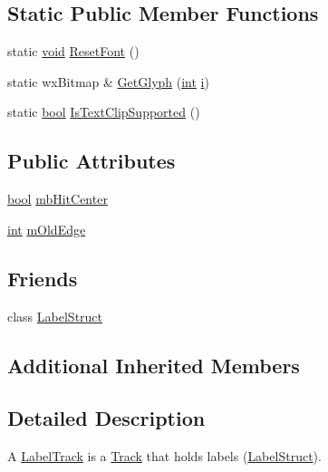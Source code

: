 \subsection*{Static Public Member Functions}
\begin{DoxyCompactItemize}
\item 
static \hyperlink{sound_8c_ae35f5844602719cf66324f4de2a658b3}{void} \hyperlink{class_label_track_a59ec120849f853dce17587dff2f71b84}{Reset\+Font} ()
\item 
static wx\+Bitmap \& \hyperlink{class_label_track_a693026a7f48f1fbb8fb6e98db6afee24}{Get\+Glyph} (\hyperlink{xmltok_8h_a5a0d4a5641ce434f1d23533f2b2e6653}{int} \hyperlink{checksum_8c_ab80e330a3bc9e38c1297fe17381e92b4}{i})
\item 
static \hyperlink{mac_2config_2i386_2lib-src_2libsoxr_2soxr-config_8h_abb452686968e48b67397da5f97445f5b}{bool} \hyperlink{class_label_track_ad7d762fccf39df6cc98f3159c1468b62}{Is\+Text\+Clip\+Supported} ()
\end{DoxyCompactItemize}
\subsection*{Public Attributes}
\begin{DoxyCompactItemize}
\item 
\hyperlink{mac_2config_2i386_2lib-src_2libsoxr_2soxr-config_8h_abb452686968e48b67397da5f97445f5b}{bool} \hyperlink{class_label_track_acd6d833a85610bf24cb008932585839f}{mb\+Hit\+Center}
\item 
\hyperlink{xmltok_8h_a5a0d4a5641ce434f1d23533f2b2e6653}{int} \hyperlink{class_label_track_a8e2ceac066c4986b80213070c8950016}{m\+Old\+Edge}
\end{DoxyCompactItemize}
\subsection*{Friends}
\begin{DoxyCompactItemize}
\item 
class \hyperlink{class_label_track_a385c3071b8a0c30580fd8b8e984a1fc0}{Label\+Struct}
\end{DoxyCompactItemize}
\subsection*{Additional Inherited Members}


\subsection{Detailed Description}
A \hyperlink{class_label_track}{Label\+Track} is a \hyperlink{class_track}{Track} that holds labels (\hyperlink{class_label_struct}{Label\+Struct}). 

